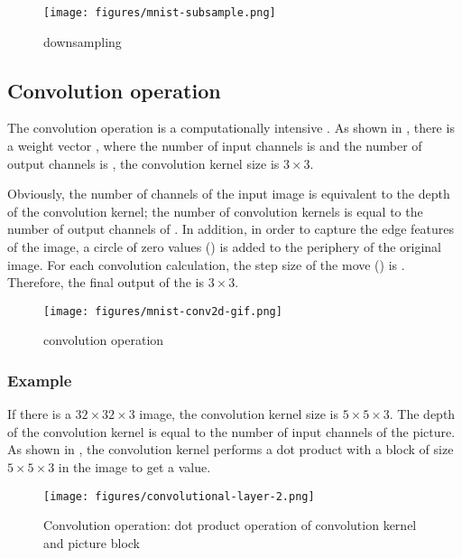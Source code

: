 \begin{content}
\begin{content}
\begin{figure}[H]
  \centering
  \texttt{[image: figures/mnist-subsample.png]}
  \caption{downsampling}
  \label{fig:mnist-subsample}
\end{figure}


\subsection{Convolution operation}

The convolution operation is a computationally intensive . As shown in , there is a weight vector , where the number of input channels is  and the number of output channels is , the convolution kernel size is $3 \times 3$.

Obviously, the number of channels of the input image is equivalent to the depth of the convolution kernel; the number of convolution kernels is equal to the number of output channels of . In addition, in order to capture the edge features of the image, a circle of zero values ​​() is added to the periphery of the original image. For each convolution calculation, the step size of the move () is . Therefore, the final output of the  is $3 \times 3$.

\begin{figure}[H]
  \centering
  \texttt{[image: figures/mnist-conv2d-gif.png]}
  \caption{convolution operation}
  \label{fig:mnist-conv2d-gif}
\end{figure}


\subsubsection{Example}
If there is a $32 \times 32 \times 3$ image, the convolution kernel size is $5 \times 5 \times 3$. The depth of the convolution kernel is equal to the number of input channels of the picture. As shown in , the convolution kernel performs a dot product with a block of size $5 \times 5 \times 3$ in the image to get a value.

\begin{figure}[H]
  \centering
  \texttt{[image: figures/convolutional-layer-2.png]}
  \caption{Convolution operation: dot product operation of convolution kernel and picture block}
  \label{fig:mnist-conv-1dot}
\end{figure}


\end{content}
\end{content}
